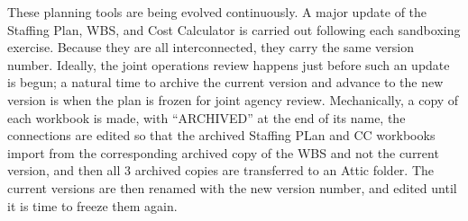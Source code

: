 These planning tools are being evolved continuously.
A major update of the Staffing Plan, WBS, and Cost Calculator is carried out following each sandboxing exercise.
Because they are all interconnected, they carry the same version number.
Ideally, the joint operations review happens just before such an update is begun; a natural time to archive the current version and advance to the new version is when the plan is frozen for joint agency review.
Mechanically, a copy of each workbook is made, with ``ARCHIVED'' at the end of its name, the connections are edited so that the archived Staffing PLan and CC workbooks import from the corresponding archived copy of the WBS and not the current version, and then all 3 archived copies are transferred to an Attic folder.
The current versions are then renamed with the new version number, and edited until it is time to freeze them again.
